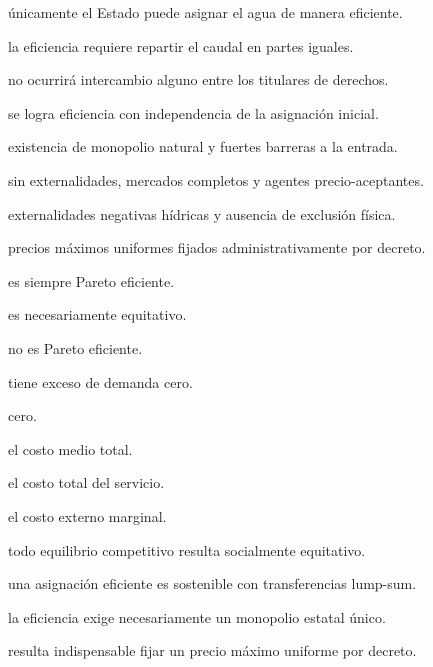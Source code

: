 \begin{opts}
    \item únicamente el Estado puede asignar el agua de manera eficiente.
    \item la eficiencia requiere repartir el caudal en partes iguales.
    \item no ocurrirá intercambio alguno entre los titulares de derechos.
    \item se logra eficiencia con independencia de la asignación inicial.
\end{opts}

\begin{opts}
    \item existencia de monopolio natural y fuertes barreras a la entrada.
    \item sin externalidades, mercados completos y agentes precio-aceptantes.
    \item externalidades negativas hídricas y ausencia de exclusión física.
    \item precios máximos uniformes fijados administrativamente por decreto.
\end{opts}

\begin{opts}
    \item es siempre Pareto eficiente.
    \item es necesariamente equitativo.
    \item no es Pareto eficiente.
    \item tiene exceso de demanda cero.
\end{opts}

\begin{opts}
    \item cero.
    \item el costo medio total.
    \item el costo total del servicio.
    \item el costo externo marginal.
\end{opts}

\begin{opts}
    \item todo equilibrio competitivo resulta socialmente equitativo.
    \item una asignación eficiente es sostenible con transferencias lump-sum.
    \item la eficiencia exige necesariamente un monopolio estatal único.
    \item resulta indispensable fijar un precio máximo uniforme por decreto.
\end{opts}

